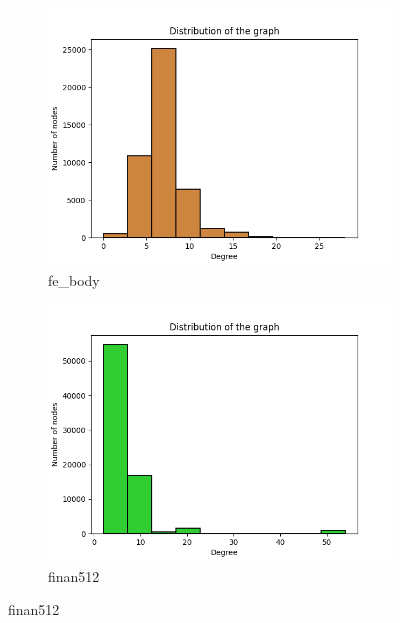 
\begin{figure}[h!]
\centering
\begin{subfigure}{.35\textwidth}
  \centering
  \includegraphics[width=\linewidth]{medium_graphs/fe_body.png}  
  \caption{fe\_body}
  \label{fig:sub-first}
\end{subfigure}
\begin{subfigure}{.35\textwidth}
  \centering
  \includegraphics[width=\linewidth]{medium_graphs/finan512.png}  
  \caption{finan512}
  \label{fig:sub-second}
\end{subfigure}


\end{figure}
